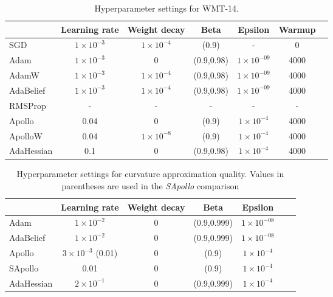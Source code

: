 \begin{table}[h!]
    \centering
    \caption{Hyperparameter settings for WMT-14.}
    \label{tab:wmt14-params}
    \begin{tabular}{lcccccc}  %
        \toprule
        & \textbf{Learning rate} & \textbf{Weight decay} & \textbf{Beta} & \textbf{Epsilon} & \textbf{Warmup}  \\
        \midrule
        SGD         & $1 \times 10^{-3}$ & $1 \times 10 ^{-4} $ & (0.9) & - & 0  \\
        Adam        & $1 \times 10^{-3}$ & 0  & (0.9,0.98) & $1 \times 10^{-09}$ & 4000     \\
        AdamW        & $1 \times 10^{-3}$ & $1 \times 10 ^{-4}$  & (0.9,0.98) & $1 \times 10^{-09}$ & 4000 \\
        AdaBelief   & $1 \times 10^{-3}$ & $1 \times 10 ^{-4}$   & (0.9,0.98) & $1 \times 10^{-09}$ & 4000  \\
        RMSProp     & - & - & - & -& - \\
        Apollo      & 0.04  & 0  & (0.9) & $1 \times 10 ^{-4} $ & 4000  \\
        ApolloW     & 0.04  & $1 \times 10^{-8}$  & (0.9) & $1 \times 10 ^{-4} $ & 4000  \\
        AdaHessian  & 0.1 & 0  & (0.9,0.98) &$1 \times 10 ^{-4} $& 4000 \\
        \bottomrule
    \end{tabular}
\end{table}

\begin{table}[h!]
    \centering
    \caption{Hyperparameter settings for curvature approximation quality. Values in parentheses are used in the \emph{SApollo} comparison}
    \label{tab:curve-approx-params}
    \begin{tabular}{lcccccc}  %
        \toprule
        & \textbf{Learning rate} & \textbf{Weight decay} & \textbf{Beta} & \textbf{Epsilon} \\
        \midrule
        Adam        & $1 \times 10^{-2}$ & 0  & (0.9,0.999) & $1 \times 10^{-08}$   \\
        AdaBelief   & $1 \times 10^{-2}$ & 0   & (0.9,0.999) & $1 \times 10^{-08}$   \\
        Apollo      & $3 \times 10^{-3}$ (0.01)  & 0  & (0.9)  & $1 \times 10 ^{-4} $  \\
        SApollo      & 0.01 & 0  & (0.9)  & $1 \times 10 ^{-4} $  \\

        AdaHessian  & $2 \times 10^{-1}$ & 0  & (0.9,0.999) &   $1 \times 10 ^{-4} $ \\
        \bottomrule
    \end{tabular}
\end{table}



